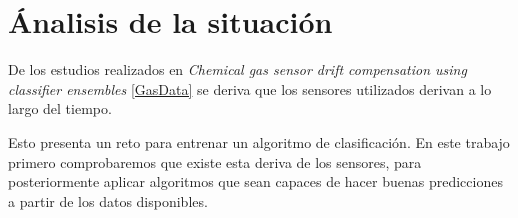 \chapter{Ánalisis de la situación}

De los estudios realizados en
\emph{Chemical gas sensor drift compensation using classifier ensembles}
\ref{GasData}
se deriva que los sensores utilizados derivan a lo largo del tiempo.

Esto presenta un reto para entrenar un algoritmo de clasificación. En este trabajo primero comprobaremos
que existe esta deriva de los sensores, para posteriormente aplicar algoritmos
que sean capaces de hacer buenas predicciones a partir de los datos disponibles.


